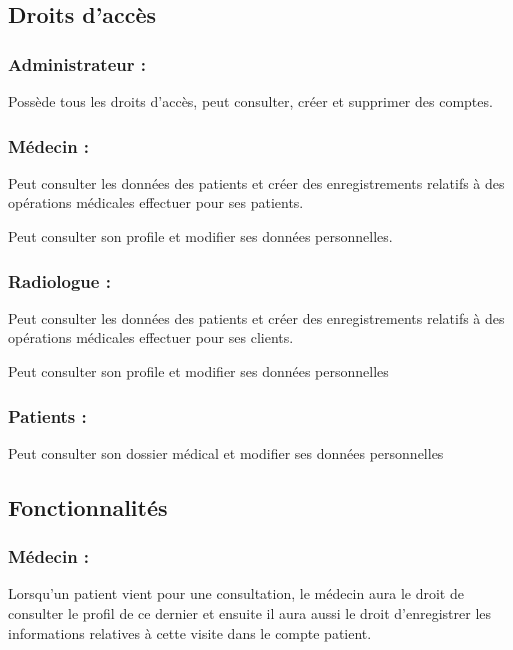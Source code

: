\subsection{Droits d’accès}

\subsubsection{Administrateur :}
   

Possède tous les droits d’accès, peut consulter, créer et supprimer des comptes. 

\subsubsection{ Médecin :}

Peut consulter les données des patients et créer des enregistrements relatifs à des opérations médicales effectuer pour ses patients. 

Peut consulter son profile et modifier ses données personnelles.

\subsubsection{Radiologue :}   

Peut consulter les données des patients et créer des enregistrements relatifs à des opérations médicales effectuer pour ses clients. 

Peut consulter son profile et modifier ses données personnelles 

\subsubsection{Patients :}

Peut consulter son dossier médical et modifier ses données personnelles 

\subsection{Fonctionnalités}

\subsubsection{Médecin :} 

Lorsqu’un patient vient pour une consultation, le médecin aura le droit de consulter le profil de ce dernier et ensuite il aura aussi le droit d’enregistrer les informations relatives à cette visite dans le compte patient. 

